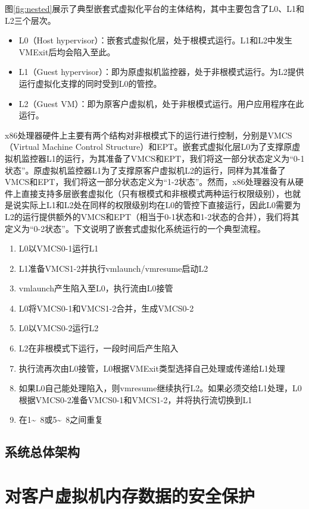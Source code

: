 图\ref{fig:nested}展示了典型嵌套式虚拟化平台的主体结构，其中主要包含了L0、L1和L2三个层次。

\begin{itemize}
\item{L0（Host hypervisor）：嵌套式虚拟化层，处于根模式运行。L1和L2中发生VMExit后均会陷入至此。}
\item{L1（Guest hypervisor）：即为原虚拟机监控器，处于非根模式运行。为L2提供运行虚拟化支撑的同时受到L0的管控。}
\item{L2（Guest VM）：即为原客户虚拟机，处于非根模式运行。用户应用程序在此运行。}
\end{itemize}

x86处理器硬件上主要有两个结构对非根模式下的运行进行控制，分别是VMCS（Virtual Machine Control Structure）和EPT。嵌套式虚拟化层L0为了支撑原虚拟机监控器L1的运行，为其准备了VMCS和EPT，我们将这一部分状态定义为“0-1状态”。原虚拟机监控器L1为了支撑原客户虚拟机L2的运行，同样为其准备了VMCS和EPT，我们将这一部分状态定义为“1-2状态”。然而，x86处理器没有从硬件上直接支持多层嵌套虚拟化（只有根模式和非根模式两种运行权限级别），也就是说实际上L1和L2处在同样的权限级别均在L0的管控下直接运行，因此L0需要为L2的运行提供额外的VMCS和EPT（相当于0-1状态和1-2状态的合并），我们将其定义为“0-2状态”。下文说明了嵌套式虚拟化系统运行的一个典型流程。

\begin{enumerate}
\item L0以VMCS0-1运行L1
\item L1准备VMCS1-2并执行vmlaunch/vmresume启动L2
\item vmlaunch产生陷入至L0，执行流由L0接管
\item L0将VMCS0-1和VMCS1-2合并，生成VMCS0-2
\item L0以VMCS0-2运行L2
\item L2在非根模式下运行，一段时间后产生陷入
\item 执行流再次由L0接管，L0根据VMExit类型选择自己处理或传递给L1处理
\item 如果L0自己能处理陷入，则vmresume继续执行L2。如果必须交给L1处理，L0根据VMCS0-2准备VMCS0-1和VMCS1-2，并将执行流切换到L1
\item 在1\~~8或5\~~8之间重复
\end{enumerate}

\subsection{系统总体架构}


\section{对客户虚拟机内存数据的安全保护}

